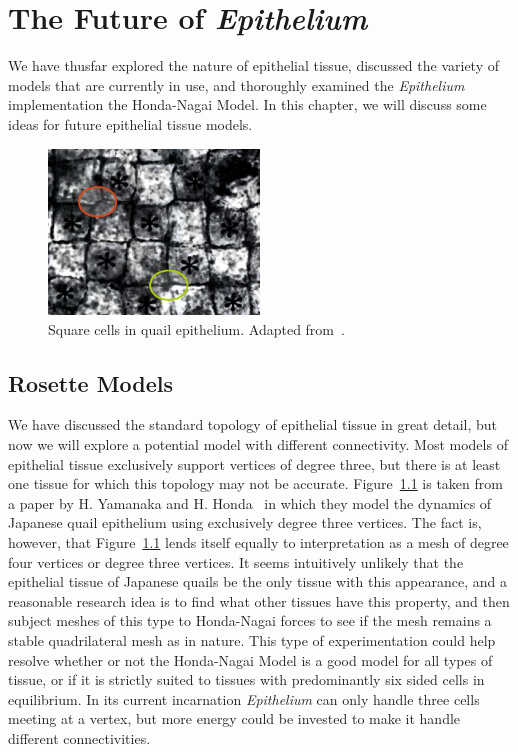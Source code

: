 \chapter{The Future of \emph{Epithelium}}
\label{chap:advances}

We have thusfar explored the nature of epithelial tissue, discussed the variety of models that are currently in use, and thoroughly examined the \emph{Epithelium} implementation the Honda-Nagai Model. In this chapter, we will discuss some ideas for future epithelial tissue models. 

\begin{figure}[hb]
\centering
\includegraphics[width=0.5\textwidth]{../diagrams/checkers.jpg}
\caption{Square cells in quail epithelium. Adapted from~\cite{Checkers}.}
\label{fig:quail}
\end{figure}

\section{Rosette Models}
We have discussed the standard topology of epithelial tissue in great detail, but now we will explore a potential model with different connectivity. Most models of epithelial tissue exclusively support vertices of degree three, but there is at least one tissue for which this topology may not be accurate. Figure~\ref{fig:quail} is taken from a paper by H. Yamanaka and H. Honda~\cite{Checkers} in which they model the dynamics of Japanese quail epithelium using exclusively degree three vertices. The fact is, however, that Figure~\ref{fig:quail} lends itself equally to interpretation as a mesh of degree four vertices or degree three vertices. It seems intuitively unlikely that the epithelial tissue of Japanese quails be the only tissue with this appearance, and a reasonable research idea is to find what other tissues have this property, and then subject meshes of this type to Honda-Nagai forces to see if the mesh remains a stable quadrilateral mesh as in nature. This type of experimentation could help resolve whether or not the Honda-Nagai Model is a good model for all types of tissue, or if it is strictly suited to tissues with predominantly six sided cells in equilibrium. In its current incarnation \emph{Epithelium} can only handle three cells meeting at a vertex, but more energy could be invested to make it handle different connectivities.

